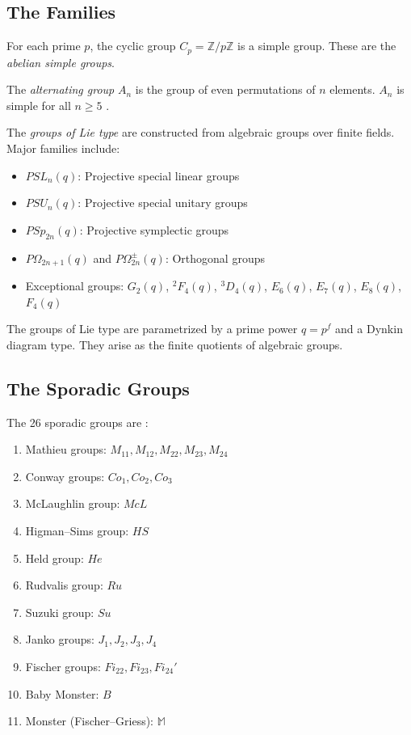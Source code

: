 \subsection{The Families}

\begin{definition}
For each prime $p$, the cyclic group $C_p = \mathbb{Z}/p\mathbb{Z}$ is a simple group. These are the \emph{abelian simple groups}.
\end{definition}

\begin{definition}
The \emph{alternating group} $A_n$ is the group of even permutations of $n$ elements. $A_n$ is simple for all $n \geq 5$ \cite{galois1832}.
\end{definition}

\begin{definition}
The \emph{groups of Lie type} are constructed from algebraic groups over finite fields. Major families include:
\begin{itemize}
\item $PSL_n(q)$: Projective special linear groups
\item $PSU_n(q)$: Projective special unitary groups
\item $PSp_{2n}(q)$: Projective symplectic groups
\item $P\Omega_{2n+1}(q)$ and $P\Omega_{2n}^{\pm}(q)$: Orthogonal groups
\item Exceptional groups: $G_2(q)$, $^2F_4(q)$, $^3D_4(q)$, $E_6(q)$, $E_7(q)$, $E_8(q)$, $F_4(q)$
\end{itemize}
\end{definition}

The groups of Lie type are parametrized by a prime power $q = p^f$ and a Dynkin diagram type. They arise as the finite quotients of algebraic groups.

\subsection{The Sporadic Groups}

The 26 sporadic groups are \cite{conway1985}:

\begin{enumerate}
\item Mathieu groups: $M_{11}, M_{12}, M_{22}, M_{23}, M_{24}$
\item Conway groups: $Co_1, Co_2, Co_3$
\item McLaughlin group: $McL$
\item Higman--Sims group: $HS$
\item Held group: $He$
\item Rudvalis group: $Ru$
\item Suzuki group: $Su$
\item Janko groups: $J_1, J_2, J_3, J_4$
\item Fischer groups: $Fi_{22}, Fi_{23}, Fi_{24}'$
\item Baby Monster: $B$
\item Monster (Fischer--Griess): $\mathbb{M}$
\end{enumerate}

